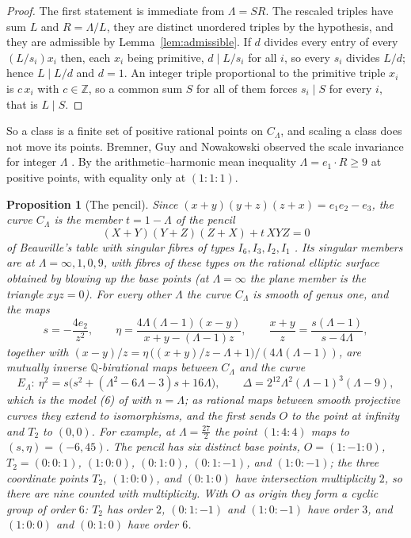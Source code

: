 \documentclass[11pt]{amsart}
\newtheorem{proposition}[theorem]{Proposition}
\theoremstyle{definition}
\theoremstyle{remark}
\newcommand{\Q}{\mathbb{Q}}
\newcommand{\Z}{\mathbb{Z}}
\begin{document}
\begin{proof}
The first statement is immediate from $\Lambda=SR$. The rescaled triples have sum $L$ and $R=\Lambda/L$, they are distinct unordered triples by the hypothesis, and they are admissible by Lemma~\ref{lem:admissible}. If $d$ divides every entry of every $(L/s_i)x_i$ then, each $x_i$ being primitive, $d\mid L/s_i$ for all $i$, so every $s_i$ divides $L/d$; hence $L\mid L/d$ and $d=1$. An integer triple proportional to the primitive triple $x_i$ is $c\,x_i$ with $c\in\Z$, so a common sum $S$ for all of them forces $s_i\mid S$ for every $i$, that is $L\mid S$.
\end{proof}

So a class is a finite set of positive rational points on $C_\Lambda$, and scaling a class does not move its points. Bremner, Guy and Nowakowski observed the scale invariance for integer $\Lambda$ \cite[p.~117]{bgn1993}. By the arithmetic--harmonic mean inequality $\Lambda=e_1\cdot R\ge9$ at positive points, with equality only at $(1:1:1)$.

\begin{proposition}[The pencil]\label{prop:pencil}
Since $(x+y)(y+z)(z+x)=e_1e_2-e_3$, the curve $C_\Lambda$ is the member $t=1-\Lambda$ of the pencil
\[
  (X+Y)(Y+Z)(Z+X)+t\,XYZ=0
\]
of Beauville's table with singular fibres of types $I_6,I_3,I_2,I_1$ \cite[Th\'eor\`eme and Tableau, p.~658]{beauville1982}. Its singular members are at $\Lambda=\infty,1,0,9$, with fibres of these types on the rational elliptic surface obtained by blowing up the base points (at $\Lambda=\infty$ the plane member is the triangle $xyz=0$). For every other $\Lambda$ the curve $C_\Lambda$ is smooth of genus one, and the maps
\[
  s=-\frac{4e_2}{z^2},\qquad \eta=\frac{4\Lambda(\Lambda-1)(x-y)}{x+y-(\Lambda-1)z},\qquad
  \frac{x+y}{z}=\frac{s(\Lambda-1)}{s-4\Lambda},
\]
together with $(x-y)/z=\eta\,\big((x+y)/z-\Lambda+1\big)/(4\Lambda(\Lambda-1))$, are mutually inverse $\Q$-birational maps between $C_\Lambda$ and the curve
\begin{equation}\label{eq:weierstrass}
  E_\Lambda:\ \eta^2=s\big(s^2+(\Lambda^2-6\Lambda-3)s+16\Lambda\big),\qquad
  \Delta=2^{12}\Lambda^2(\Lambda-1)^3(\Lambda-9),
\end{equation}
which is the model (6) of \cite[p.~118]{bgn1993} with $n=\Lambda$; as rational maps between smooth projective curves they extend to isomorphisms, and the first sends $O$ to the point at infinity and $T_2$ to $(0,0)$. For example, at $\Lambda=\frac{27}2$ the point $(1:4:4)$ maps to $(s,\eta)=(-6,45)$. The pencil has six distinct base points, $O=(1:-1:0)$, $T_2=(0:0:1)$, $(1:0:0)$, $(0:1:0)$, $(0:1:-1)$, and $(1:0:-1)$; the three coordinate points $T_2$, $(1:0:0)$, and $(0:1:0)$ have intersection multiplicity $2$, so there are nine counted with multiplicity. With $O$ as origin they form a cyclic group of order $6$: $T_2$ has order $2$, $(0:1:-1)$ and $(1:0:-1)$ have order $3$, and $(1:0:0)$ and $(0:1:0)$ have order $6$.
\end{proposition}
\end{document}
